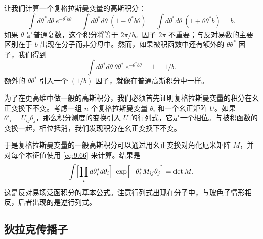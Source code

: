 让我们计算一个复格拉斯曼变量的高斯积分：
\begin{equation}
  \int d\theta^{*}d\theta\ e^{-\theta^{*}b\theta}
  = \int d\theta^{*}d\theta\ (1 - \theta^{*}b\theta)
  = \int d\theta^{*}d\theta\ (1 + \theta\theta^{*}b) = b .
  \label{eq:9.66}
\end{equation}
如果 $\theta$ 是普通复数，这个积分将等于 $2\pi/b$。因子 $2\pi$ 不重要；与反对易数的主要区别在于 $b$ 出现在分子而非分母中。然而，如果被积函数中还有额外的 $\theta\theta^{*}$ 因子，我们得到
\begin{equation}
  \int d\theta^{*}d\theta\ \theta\theta^{*}\ e^{-\theta^{*}b\theta}
  = 1 = 1/b .
  \label{eq:9.67}
\end{equation}
额外的 $\theta\theta^{*}$ 引入一个 $(1/b)$ 因子，就像在普通高斯积分中一样。

为了在更高维中做一般的高斯积分，我们必须首先证明复格拉斯曼变量的积分在幺正变换下不变。考虑一组 $n$ 个复格拉斯曼变量 $\theta_i$ 和一个幺正矩阵 $U$。如果 $\theta'_i = U_{ij}\theta_j$，那么积分测度的变换引入 $U$ 的行列式，它是一个相位。与被积函数的变换一起，相位抵消，我们发现积分在幺正变换下不变。

于是复格拉斯曼变量的一般高斯积分可以通过用幺正变换对角化厄米矩阵 $M$，并对每个本征值使用 \eqref{eq:9.66} 来计算。结果是
\begin{equation}
  \int \Bigl[ \prod_i d\theta^{*}_i d\theta_i \Bigr]\
    \exp\Bigl[ -\theta^{*}_i M_{ij}\theta_j \Bigr] = \det M .
  \label{eq:9.70}
\end{equation}
这是反对易场泛函积分的基本公式。注意行列式出现在分子中，与玻色子情形相反，后者出现的是逆行列式。

\subsection{狄拉克传播子}

